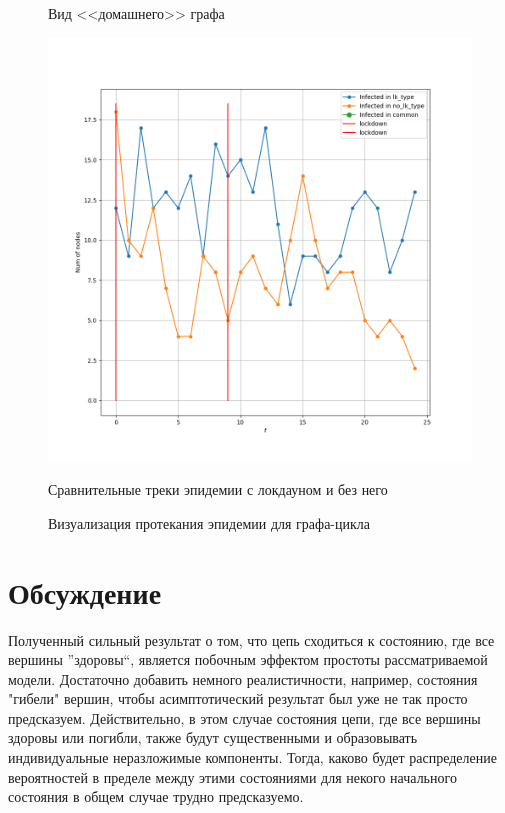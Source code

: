 \begin{figure}[h]
\begin{center}
\begin{minipage}{0.49\linewidth}
				\centering
				Вид <<домашнего>> графа
			\end{minipage}
		\end{center}
		
		\begin{center}
			\begin{minipage}{0.49\linewidth}
				\includegraphics[width=\linewidth, keepaspectratio]{../figs/evidence3/tracks}
				
				\centering
				Сравнительные треки эпидемии с локдауном и без него
			\end{minipage}
		\end{center}
		
		\caption{Визуализация протекания эпидемии для графа-цикла}\label{pic:evidence_2}
	\end{figure}

	\section*{Обсуждение}
	
	Полученный сильный результат о том, что цепь сходиться к состоянию, где все вершины ''здоровы``, является побочным эффектом простоты рассматриваемой модели.  Достаточно добавить немного реалистичности, например, состояния "гибели" вершин, чтобы асимптотический результат был уже не так просто предсказуем. Действительно, в этом случае состояния цепи, где все вершины здоровы или погибли, также будут существенными и образовывать индивидуальные неразложимые компоненты. Тогда, каково будет распределение вероятностей в пределе между этими состояниями для некого начального состояния в общем случае трудно предсказуемо.
	
